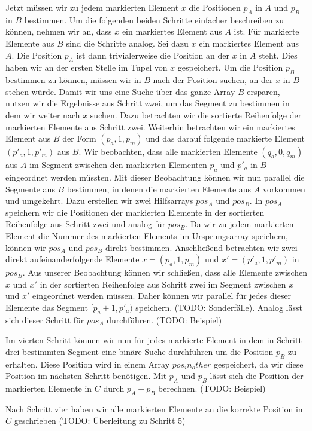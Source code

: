 Jetzt müssen wir zu jedem markierten Element $x$ die Positionen $p_A$ in $A$ und $p_B$ in $B$ bestimmen. Um die folgenden beiden Schritte einfacher beschreiben zu können, nehmen wir an, dass $x$ ein markiertes Element aus $A$ ist. Für markierte Elemente aus $B$ sind die Schritte analog.
Sei dazu $x$ ein markiertes Element aus $A$. Die Position $p_A$ ist dann trivialerweise die Position an der $x$ in $A$ steht. Dies haben wir an der ersten Stelle im Tupel von $x$ gespeichert. Um die Position $p_B$ bestimmen zu können, müssen wir in $B$ nach der Position suchen, an der $x$ in $B$ stehen würde. Damit wir uns eine Suche über das ganze Array $B$ ersparen, nutzen wir die Ergebnisse aus Schritt zwei, um das Segment zu bestimmen in dem wir weiter nach $x$ suchen. 
Dazu betrachten wir die sortierte Reihenfolge der markierten Elemente aus Schritt zwei. Weiterhin betrachten wir ein markiertes Element aus $B$ der Form $(p_a, 1, p_m)$ und das darauf folgende markierte Element $(p'_a, 1, p'_m)$ aus $B$. Wir beobachten, dass alle markierten Elemente $(q_a, 0, q_m)$ aus $A$ im Segment zwischen den markierten Elementen $p_a$ und $p'_a$ in $B$ eingeordnet werden müssten. Mit dieser Beobachtung können wir nun parallel die Segmente aus $B$ bestimmen, in denen die markierten Elemente aus $A$ vorkommen und umgekehrt. Dazu erstellen wir zwei Hilfsarrays $pos_A$ und $pos_B$. In $pos_A$ speichern wir die Positionen der markierten Elemente in der sortierten Reihenfolge aus Schritt zwei und analog für $pos_B$. Da wir zu jedem markierten Element die Nummer des markierten Elements im Ursprungsarray speichern, können wir $pos_A$ und $pos_B$ direkt bestimmen. Anschließend betrachten wir zwei direkt aufeinanderfolgende Elemente $x=(p_a, 1, p_m)$ und $x'=(p'_a, 1, p'_m)$ in $pos_B$. Aus unserer Beobachtung können wir schließen, dass alle Elemente zwischen $x$ und $x'$ in der sortierten Reihenfolge aus Schritt zwei im Segment zwischen $x$ und $x'$ eingeordnet werden müssen. Daher können wir parallel für jedes dieser Elemente das Segment $[p_a+1, p'_a)$ speichern. (TODO: Sonderfälle). Analog lässt sich dieser Schritt für $pos_A$ durchführen.
(TODO: Beispiel)

Im vierten Schritt können wir nun für jedes markierte Element in dem in Schritt drei bestimmten Segment eine binäre Suche durchführen um die Position $p_B$ zu erhalten. Diese Position wird in einem Array $pos_in_other$ gespeichert, da wir diese Position im nächsten Schritt benötigen. Mit $p_A$ und $p_B$ lässt sich die Position der markierten Elemente in $C$ durch $p_A+p_B$ berechnen. 
(TODO: Beispiel)

Nach Schritt vier haben wir alle markierten Elemente an die korrekte Position in $C$ geschrieben (TODO: Überleitung zu Schritt 5)

